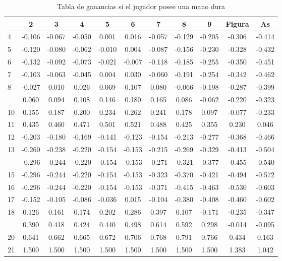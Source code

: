 \documentclass[12pt,a4paper,]{book}
\numberwithin{dummy}{section}
\theoremstyle{ocrenumbox}
\theoremstyle{blacknumex}
\theoremstyle{blacknumbox}
\theoremstyle{ocrenum}
\theoremstyle{ocrenum}
\begin{document}
\begin{longtable}[t]{lcccccccccc}
\caption{\label{tab:unnamed-chunk-72}Tabla de ganancias si el jugador posee una mano dura}\\
\toprule
 & 2 & 3 & 4 & 5 & 6 & 7 & 8 & 9 & Figura & As\\
\midrule
4 & -0.106 & -0.067 & -0.050 & 0.001 & 0.016 & -0.057 & -0.129 & -0.205 & -0.306 & -0.414\\
5 & -0.120 & -0.080 & -0.062 & -0.010 & 0.004 & -0.087 & -0.156 & -0.230 & -0.328 & -0.432\\
6 & -0.132 & -0.092 & -0.073 & -0.021 & -0.007 & -0.118 & -0.185 & -0.255 & -0.350 & -0.451\\
7 & -0.103 & -0.063 & -0.045 & 0.004 & 0.030 & -0.060 & -0.191 & -0.254 & -0.342 & -0.462\\
8 & -0.027 & 0.010 & 0.026 & 0.069 & 0.107 & 0.080 & -0.066 & -0.198 & -0.287 & -0.399\\
\addlinespace
9 & 0.060 & 0.094 & 0.108 & 0.146 & 0.180 & 0.165 & 0.086 & -0.062 & -0.220 & -0.323\\
10 & 0.155 & 0.187 & 0.200 & 0.234 & 0.262 & 0.241 & 0.178 & 0.097 & -0.077 & -0.233\\
11 & 0.435 & 0.460 & 0.471 & 0.501 & 0.521 & 0.488 & 0.425 & 0.355 & 0.230 & 0.046\\
12 & -0.203 & -0.180 & -0.169 & -0.141 & -0.123 & -0.154 & -0.213 & -0.277 & -0.368 & -0.466\\
13 & -0.260 & -0.238 & -0.220 & -0.154 & -0.153 & -0.215 & -0.269 & -0.329 & -0.413 & -0.504\\
\addlinespace
14 & -0.296 & -0.244 & -0.220 & -0.154 & -0.153 & -0.271 & -0.321 & -0.377 & -0.455 & -0.540\\
15 & -0.296 & -0.244 & -0.220 & -0.154 & -0.153 & -0.323 & -0.370 & -0.421 & -0.494 & -0.572\\
16 & -0.296 & -0.244 & -0.220 & -0.154 & -0.153 & -0.371 & -0.415 & -0.463 & -0.530 & -0.603\\
17 & -0.152 & -0.105 & -0.086 & -0.036 & 0.015 & -0.104 & -0.380 & -0.408 & -0.460 & -0.602\\
18 & 0.126 & 0.161 & 0.174 & 0.202 & 0.286 & 0.397 & 0.107 & -0.171 & -0.235 & -0.347\\
\addlinespace
19 & 0.390 & 0.418 & 0.424 & 0.440 & 0.498 & 0.614 & 0.592 & 0.298 & -0.014 & -0.095\\
20 & 0.641 & 0.662 & 0.665 & 0.672 & 0.706 & 0.768 & 0.791 & 0.766 & 0.434 & 0.163\\
21 & 1.500 & 1.500 & 1.500 & 1.500 & 1.500 & 1.500 & 1.500 & 1.500 & 1.383 & 1.042\\

\end{longtable}
\end{document}
